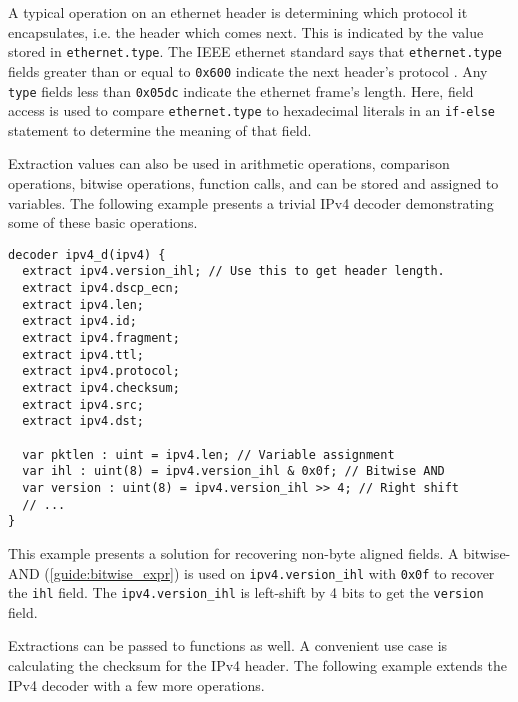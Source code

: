 A typical operation on an ethernet header is determining which protocol
it encapsulates, i.e. the header which comes next. This is indicated
by the value stored in \texttt{ethernet.type}.
The IEEE ethernet standard says that \texttt{ethernet.type} fields greater than 
or equal to \texttt{0x600} indicate the next header's protocol \cite{eth_std}. 
Any \texttt{type} fields less than \texttt{0x05dc} indicate the ethernet frame's 
length. 
Here, field access is used to compare \texttt{ethernet.type} to 
hexadecimal literals in an \texttt{if-else} statement to determine the meaning of 
that field.

Extraction values can also be used in arithmetic operations, comparison 
operations, bitwise operations, function calls,
and can be stored and assigned to variables. The following example presents
a trivial IPv4 decoder demonstrating some of these basic operations.

\begin{codepage}
\begin{lstlisting}
decoder ipv4_d(ipv4) {
  extract ipv4.version_ihl; // Use this to get header length.
  extract ipv4.dscp_ecn;
  extract ipv4.len;
  extract ipv4.id;
  extract ipv4.fragment;
  extract ipv4.ttl;
  extract ipv4.protocol;
  extract ipv4.checksum;
  extract ipv4.src;
  extract ipv4.dst;

  var pktlen : uint = ipv4.len; // Variable assignment
  var ihl : uint(8) = ipv4.version_ihl & 0x0f; // Bitwise AND
  var version : uint(8) = ipv4.version_ihl >> 4; // Right shift
  // ...
}
\end{lstlisting}
\end{codepage}

This example presents a solution for recovering non-byte aligned
fields. A bitwise-AND (\ref{guide:bitwise_expr}) is used on \texttt{ipv4.version\_ihl}
with \texttt{0x0f} to recover the \texttt{ihl} field. The 
\texttt{ipv4.version\_ihl} is left-shift by 4 bits to get the \texttt{version} field.

Extractions can be passed to functions as well. A convenient use case is 
calculating the checksum for the IPv4 header. 
The following example extends the IPv4 decoder with a few more operations.

